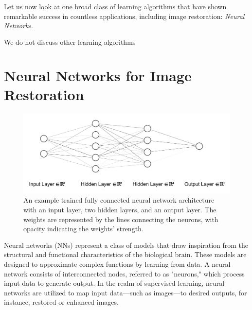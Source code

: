 
Let us now look at one broad class of learning algorithms that have shown remarkable success in countless applications, including image restoration: \textit{Neural Networks}.

We do not discuss other learning algorithms

\section{Neural Networks for Image Restoration}

\begin{figure}[h]
    \centering
    \includegraphics[width=1\linewidth]{images/simple_nn_architecture.pdf}
    \caption{An example trained fully connected neural network architecture with an input layer, two hidden layers, and an output layer. The weights are represented by the lines connecting the neurons, with opacity indicating the weights' strength.}
    \label{fig:simple-nn-architecture}
\end{figure}
Neural networks (NNs) represent a class of models that draw inspiration from the structural and functional characteristics of the biological brain. These models are designed to approximate complex functions by learning from data. A neural network consists of interconnected nodes, referred to as "neurons," which process input data to generate output. In the realm of supervised learning, neural networks are utilized to map input data—such as images—to desired outputs, for instance, restored or enhanced images.

